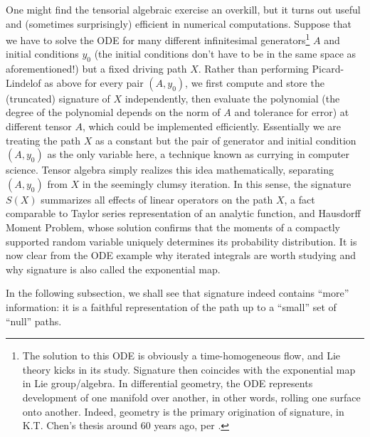 \documentclass[fleqn]{article}
\theoremstyle{definition}
\theoremstyle{remark}
\begin{document}
\par
One might find the tensorial algebraic exercise an overkill, but it turns out useful and (sometimes surprisingly) efficient in numerical computations. Suppose that we have to solve the ODE for many different infinitesimal generators\footnote{The solution to this ODE is obviously a time-homogeneous flow, and Lie theory kicks in its study. Signature then coincides with the exponential map in Lie group/algebra. In differential geometry, the ODE represents development of one manifold over another, in other words, rolling one surface onto another. Indeed, geometry is the primary origination of signature, in K.T. Chen's thesis around 60 years ago, per \citet{Hambly2005}.} $A$ and initial conditions $y_0$ (the initial conditions don't have to be in the same space as aforementioned!) but a fixed driving path $X$. Rather than performing Picard-Lindelof as above for every pair $(A,y_0)$, we first compute and store the (truncated) signature of $X$ independently, then evaluate the polynomial (the degree of the polynomial depends on the norm of $A$ and tolerance for error) at different tensor $A$, which could be implemented efficiently. Essentially we are treating the path $X$ as a constant but the pair of generator and initial condition $(A,y_0)$ as the only variable here, a technique known as currying in computer science. Tensor algebra simply realizes this idea mathematically, separating $(A,y_0)$ from $X$ in the seemingly clumsy iteration. In this sense, the signature $S(X)$ summarizes all effects of linear operators on the path $X$, a fact comparable to Taylor series representation of an analytic function, and Hausdorff Moment Problem, whose solution confirms that the moments of a compactly supported random variable uniquely determines its probability distribution. It is now clear from the ODE example why iterated integrals are worth studying and why signature is also called the exponential map.

\par
In the following subsection, we shall see that signature indeed contains ``more'' information: it is a faithful representation of the path up to a ``small'' set of ``null'' paths. 

\end{document}

